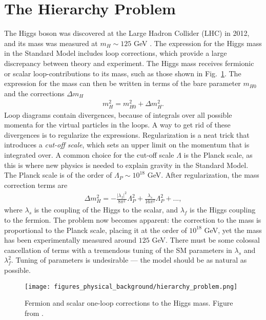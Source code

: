 \documentclass[twoside,english]{uiofysmaster}
\begin{document}
\section{The Hierarchy Problem}

The Higgs boson was discovered at the Large Hadron Collider (LHC) in 2012, and its mass was measured at $m_H \sim 125$ GeV \cite{20121}. The expression for the Higgs mass in the Standard Model includes loop corrections, which provide a large discrepancy between theory and experiment. The Higgs mass receives fermionic or scalar loop-contributions to its mass, such as those shown in Fig.~\ref{Fig:: Phys. bac.: Higgs mass contributions}. The expression for the mass can then be written in terms of the bare parameter $m_{H0}$ and the corrections $\Delta m_H$
\begin{align*}
m_H^2 = m_{H0}^2 + \Delta m_H^2.
\end{align*}
Loop diagrams contain divergences, because of integrals over all possible momenta for the virtual particles in the loops. A way to get rid of these divergences is to regularize the expressions. Regularization is a neat trick that introduces a \textit{cut-off scale}, which sets an upper limit on the momentum that is integrated over. A common choice for the cut-off scale $\Lambda$ is the Planck scale, as this is where new physics is needed to explain gravity in the Standard Model. The Planck scale is of the order of $\Lambda_P \sim 10^{18}$ GeV. After regularization, the mass correction terms are
\begin{align}
\Delta m_H^2 = - \frac{|\lambda_f|^2}{8\pi^2} \Lambda_P^2 + \frac{\lambda_s}{16\pi^2} \Lambda_P^2 +...,
\end{align}
where $\lambda_s$ is the coupling of the Higgs to the scalar, and $\lambda_f$ is the Higgs coupling to the fermion. The problem now becomes apparent: the correction to the mass is proportional to the Planck scale, placing it at the order of $10^{18}$ GeV, yet the mass has been experimentally measured around $125$ GeV. There must be some colossal cancellation of terms with a tremendous tuning of the SM parameters in $\lambda_s$ and $\lambda_f^2$. Tuning of parameters is undesirable --- the model should be as natural as possible. 

\begin{figure}[H]
\centering
\texttt{[image: figures\_physical\_background/hierarchy\_problem.png]}
\caption{Fermion and scalar one-loop corrections to the Higgs mass. Figure from \cite{batzing2017lecture}.}
\label{Fig:: Phys. bac.: Higgs mass contributions}
\end{figure}
\end{document}
